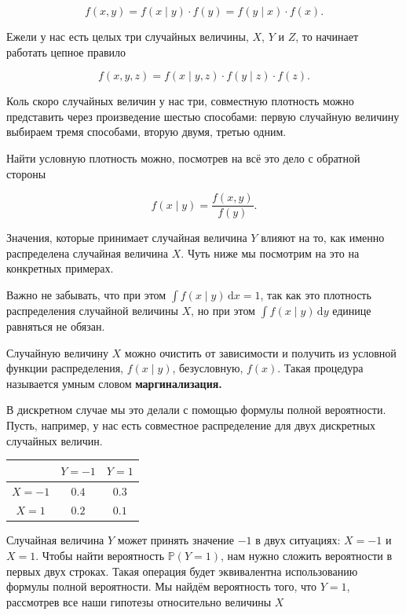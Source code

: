 \documentclass[12pt, a4paper, oneside]{extreport}
\def \mbb{\mathbb}
\def \PP{\mbb{P}}
\newcommand{\dx}[1]{\,\mathrm{d}#1} %
\newcommand{\indef}[1]{\textbf{#1}}     %
\theoremstyle{plain}              %
\theoremstyle{definition}         %
\begin{document}
\begin{equation}\label{f1}
 f(x,y) = f(x \mid y) \cdot f(y) = f(y \mid x) \cdot f(x).
\end{equation}

Ежели у нас есть целых три случайных величины, $X$, $Y$ и $Z$, то начинает работать цепное правило

\[ f(x,y,z) = f(x \mid y,z) \cdot f(y \mid z) \cdot f(z).\]

Коль скоро случайных величин у нас три, совместную плотность можно представить через произведение шестью способами: первую случайную величину выбираем тремя способами, вторую двумя, третью одним.

Найти условную плотность можно, посмотрев на всё это дело с обратной стороны

\begin{equation}\label{f2}
f(x \mid y)  =  \frac{f(x,y)}{f(y)}.
\end{equation}

Значения, которые принимает случайная величина $Y$ влияют на то, как именно распределена случайная величина $X$. Чуть ниже мы посмотрим на это на конкретных примерах. 

Важно не забывать, что при этом $\int f(x \mid y) \dx{x} = 1$, так как это плотность распределения случайной величины $X$, но при этом $\int f(x \mid y) \dx{y}$ единице равняться не обязан.

Случайную величину $X$ можно очистить от зависимости  и получить из условной функции распределения, $f(x \mid y)$, безусловную, $f(x)$.  Такая процедура называется умным словом \indef{маргинализация.}

В дискретном случае мы это делали с помощью формулы полной вероятности. Пусть, например, у нас есть совместное распределение для двух дискретных случайных величин.

\begin{center}
\begin{tabular}{c|c|c}
       &  $Y = -1$    &  $Y = 1$   \\ \hline
$X = -1$   & $0.4$    &  $0.3$ \\ \hline
$X = 1$    & $0.2$    &  $0.1$ \\
\end{tabular}
\end{center}

Случайная величина $Y$ может принять значение $-1$ в двух ситуациях: $X=-1$ и $X=1$. Чтобы найти вероятность $\PP(Y=1)$, нам нужно сложить вероятности в первых двух строках. Такая операция будет эквивалентна использованию формулы полной вероятности. Мы найдём вероятность того, что $Y=1$, рассмотрев все наши гипотезы относительно величины $X$
\end{document}
